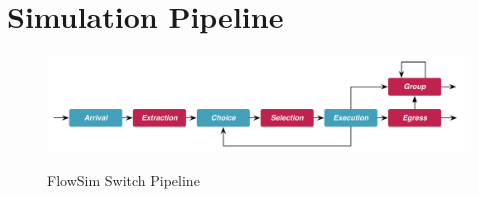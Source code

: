 \section{Simulation Pipeline}

\begin{figure}[h]
  \includegraphics[width=\linewidth]{figures/pipeline.pdf}
  \label{figure:pipeline}
  \caption{FlowSim Switch Pipeline}
\end{figure}

